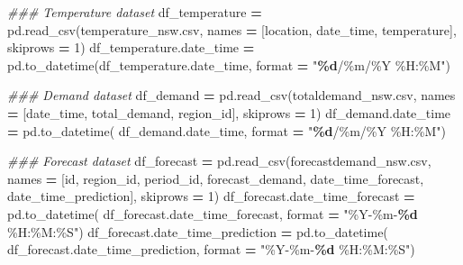 \documentclass[mstat,12pt,a4paper]{unswthesis}
\newenvironment{Shaded}{\begin{snugshade}}{\end{snugshade}}
\newcommand{\BuiltInTok}[1]{#1}
\newcommand{\CommentTok}[1]{\textcolor[rgb]{0.56,0.35,0.01}{\textit{#1}}}
\newcommand{\DecValTok}[1]{\textcolor[rgb]{0.00,0.00,0.81}{#1}}
\newcommand{\NormalTok}[1]{#1}
\newcommand{\OperatorTok}[1]{\textcolor[rgb]{0.81,0.36,0.00}{\textbf{#1}}}
\newcommand{\SpecialCharTok}[1]{\textcolor[rgb]{0.81,0.36,0.00}{\textbf{#1}}}
\newcommand{\StringTok}[1]{\textcolor[rgb]{0.31,0.60,0.02}{#1}}
\begin{document}
\begin{Shaded}
\begin{Highlighting}[]
\CommentTok{\#\#\# Temperature dataset}
\NormalTok{df\_temperature }\OperatorTok{=}\NormalTok{ pd.read\_csv(}\StringTok{\textquotesingle{}temperature\_nsw.csv\textquotesingle{}}\NormalTok{, }
\NormalTok{    names }\OperatorTok{=}\NormalTok{ [}\StringTok{\textquotesingle{}location\textquotesingle{}}\NormalTok{, }\StringTok{\textquotesingle{}date\_time\textquotesingle{}}\NormalTok{, }\StringTok{\textquotesingle{}temperature\textquotesingle{}}\NormalTok{], skiprows }\OperatorTok{=} \DecValTok{1}\NormalTok{)}
\NormalTok{df\_temperature.date\_time }\OperatorTok{=}\NormalTok{ pd.to\_datetime(df\_temperature.date\_time, }
    \BuiltInTok{format} \OperatorTok{=} \StringTok{"}\SpecialCharTok{\%d}\StringTok{/\%m/\%Y \%H:\%M"}\NormalTok{)}

\CommentTok{\#\#\# Demand dataset}
\NormalTok{df\_demand }\OperatorTok{=}\NormalTok{ pd.read\_csv(}\StringTok{\textquotesingle{}totaldemand\_nsw.csv\textquotesingle{}}\NormalTok{, }
\NormalTok{    names }\OperatorTok{=}\NormalTok{ [}\StringTok{\textquotesingle{}date\_time\textquotesingle{}}\NormalTok{, }\StringTok{\textquotesingle{}total\_demand\textquotesingle{}}\NormalTok{, }\StringTok{\textquotesingle{}region\_id\textquotesingle{}}\NormalTok{], skiprows }\OperatorTok{=} \DecValTok{1}\NormalTok{)}
\NormalTok{df\_demand.date\_time }\OperatorTok{=}\NormalTok{ pd.to\_datetime(}
\NormalTok{    df\_demand.date\_time, }\BuiltInTok{format} \OperatorTok{=} \StringTok{"}\SpecialCharTok{\%d}\StringTok{/\%m/\%Y \%H:\%M"}\NormalTok{)}

\CommentTok{\#\#\# Forecast dataset}
\NormalTok{df\_forecast }\OperatorTok{=}\NormalTok{ pd.read\_csv(}\StringTok{\textquotesingle{}forecastdemand\_nsw.csv\textquotesingle{}}\NormalTok{, }
\NormalTok{    names }\OperatorTok{=}\NormalTok{ [}\StringTok{\textquotesingle{}id\textquotesingle{}}\NormalTok{, }\StringTok{\textquotesingle{}region\_id\textquotesingle{}}\NormalTok{, }\StringTok{\textquotesingle{}period\_id\textquotesingle{}}\NormalTok{, }\StringTok{\textquotesingle{}forecast\_demand\textquotesingle{}}\NormalTok{, }
        \StringTok{\textquotesingle{}date\_time\_forecast\textquotesingle{}}\NormalTok{, }\StringTok{\textquotesingle{}date\_time\_prediction\textquotesingle{}}\NormalTok{], }
\NormalTok{    skiprows }\OperatorTok{=} \DecValTok{1}\NormalTok{)}
\NormalTok{df\_forecast.date\_time\_forecast }\OperatorTok{=}\NormalTok{ pd.to\_datetime(}
\NormalTok{    df\_forecast.date\_time\_forecast, }\BuiltInTok{format} \OperatorTok{=} \StringTok{"\%Y{-}\%m{-}}\SpecialCharTok{\%d}\StringTok{ \%H:\%M:\%S"}\NormalTok{)}
\NormalTok{df\_forecast.date\_time\_prediction }\OperatorTok{=}\NormalTok{ pd.to\_datetime(}
\NormalTok{    df\_forecast.date\_time\_prediction, }\BuiltInTok{format} \OperatorTok{=} \StringTok{"\%Y{-}\%m{-}}\SpecialCharTok{\%d}\StringTok{ \%H:\%M:\%S"}\NormalTok{)}
\end{Highlighting}
\end{Shaded}
\end{document}
